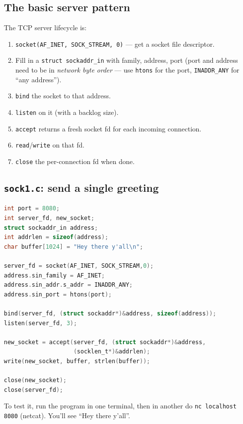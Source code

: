 \documentclass[11pt]{article}
\begin{document}
\subsection*{The basic server pattern}

The TCP server lifecycle is:
\begin{enumerate}
  \item \texttt{socket(AF\_INET, SOCK\_STREAM, 0)} --- get a socket
    file descriptor.
  \item Fill in a \texttt{struct sockaddr\_in} with family, address,
    port (port and address need to be in \emph{network byte order}
    --- use \texttt{htons} for the port, \texttt{INADDR\_ANY} for
    ``any address'').
  \item \texttt{bind} the socket to that address.
  \item \texttt{listen} on it (with a backlog size).
  \item \texttt{accept} returns a fresh socket fd for each incoming
    connection.
  \item \texttt{read}/\texttt{write} on that fd.
  \item \texttt{close} the per-connection fd when done.
\end{enumerate}

\subsection*{\texttt{sock1.c}: send a single greeting}

\begin{lstlisting}[language=C]
int port = 8080;
int server_fd, new_socket;
struct sockaddr_in address;
int addrlen = sizeof(address);
char buffer[1024] = "Hey there y'all\n";

server_fd = socket(AF_INET, SOCK_STREAM,0);
address.sin_family = AF_INET;
address.sin_addr.s_addr = INADDR_ANY;
address.sin_port = htons(port);

bind(server_fd, (struct sockaddr*)&address, sizeof(address));
listen(server_fd, 3);

new_socket = accept(server_fd, (struct sockaddr*)&address,
                    (socklen_t*)&addrlen);
write(new_socket, buffer, strlen(buffer));

close(new_socket);
close(server_fd);
\end{lstlisting}

To test it, run the program in one terminal, then in another do
\texttt{nc localhost 8080} (netcat). You'll see ``Hey there
y'all''.
\end{document}
